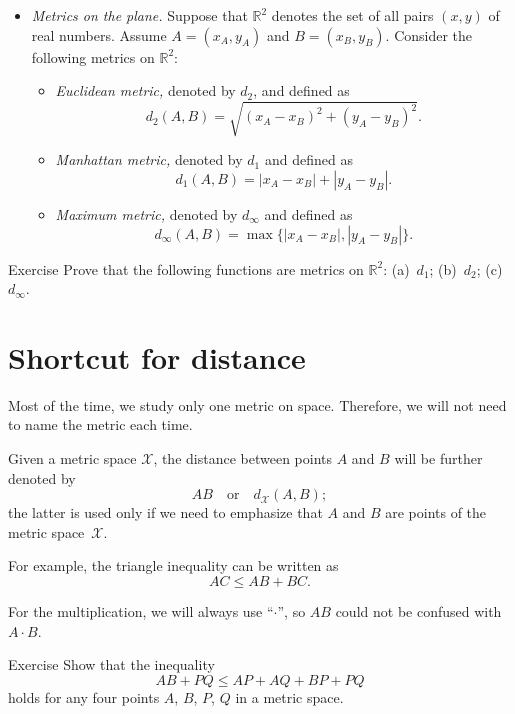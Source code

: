 \begin{itemize}
\item {}\emph{Metrics on the plane.}
Suppose that $\mathbb{R}^2$ denotes the set of all pairs $(x,y)$ of real numbers.
Assume $A=(x_A,y_A)$ and $B=(x_B,y_B)$.
Consider the following metrics on $\mathbb{R}^2$:
\begin{itemize}
\item{}\emph{Euclidean metric,} denoted by $d_2$, and defined as \label{def:d_2}
$$d_2(A,B)=\sqrt{(x_A-x_B)^2+(y_A-y_B)^2}.$$
\item\label{Manhattan plane}\emph{Manhattan metric,} denoted by $d_1$ and defined as 
$$d_1(A,B)=|x_A-x_B|+|y_A-y_B|.$$
\item{}\emph{Maximum metric,} denoted by $d_\infty$ and defined as 
$$d_\infty(A,B)=\max\{|x_A-x_B|,|y_A-y_B|\}.$$
\end{itemize}
\end{itemize}

\begin{thm}{Exercise}\label{ex:d_1+d_2+d_infty}
Prove that the following functions are metrics on $\mathbb{R}^2$:
(a)~$d_1$; (b)~$d_2$; (c)~$d_\infty$.
\end{thm}


\section*{Shortcut for distance}

Most of the time, 
we study only one metric on space.
Therefore, we will not need to name the metric each time.

Given a metric space $\mathcal X$,
the distance between points $A$ and $B$ will be further denoted by 
$$AB
\quad
\text{or}
\quad
d_{\mathcal X}(A,B);$$
the latter is used only if we need to emphasize that $A$ and $B$ are points of the metric space~$\mathcal X$.

For example, the triangle inequality can be written as 
$$AC\le AB+BC.$$

For the multiplication, we will always use ``$\cdot$'',
so $AB$ could not be confused with $A\cdot B$.

\begin{thm}{Exercise}\label{ex:4-triangle}
Show that the inequality
\[AB+PQ\le AP+AQ+BP+PQ\]
holds for any four points $A$, $B$, $P$, $Q$ in a metric space.
\end{thm}


